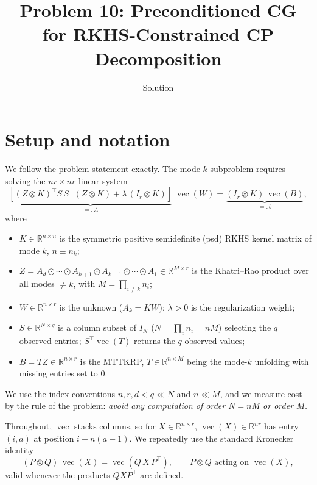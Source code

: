 \documentclass[12pt]{article}
\title{Problem 10: Preconditioned CG for RKHS-Constrained CP Decomposition}
\author{Solution}
\date{}
\DeclareMathOperator{\vecop}{vec}
\newcommand{\bR}{\mathbb{R}}
\theoremstyle{remark}
\begin{document}
\maketitle

\section{Setup and notation}

We follow the problem statement exactly. The mode-$k$ subproblem requires solving the
$nr \times nr$ linear system
\begin{equation}\label{eq:system}
  \underbrace{\left[
    (Z \otimes K)^{\!\top} S\, S^{\!\top} (Z \otimes K)
    + \lambda\, (I_r \otimes K)
  \right]}_{=:A}\; \vecop(W)
  = \underbrace{(I_r \otimes K)\,\vecop(B)}_{=:b},
\end{equation}
where
\begin{itemize}[nosep]
  \item $K \in \bR^{n\times n}$ is the symmetric positive semidefinite (psd) RKHS kernel matrix of mode $k$, $n \equiv n_k$;
  \item $Z = A_d \odot \cdots \odot A_{k+1} \odot A_{k-1} \odot \cdots \odot A_1 \in \bR^{M\times r}$ is the Khatri--Rao product over all modes $\neq k$, with $M = \prod_{i\neq k} n_i$;
  \item $W \in \bR^{n\times r}$ is the unknown ($A_k = KW$); $\lambda > 0$ is the regularization weight;
  \item $S \in \bR^{N\times q}$ is a column subset of $I_N$ ($N=\prod_i n_i = nM$) selecting the $q$ observed entries; $S^{\!\top}\vecop(T)$ returns the $q$ observed values;
  \item $B = TZ \in \bR^{n\times r}$ is the MTTKRP, $T\in\bR^{n\times M}$ being the mode-$k$ unfolding with missing entries set to $0$.
\end{itemize}
We use the index conventions $n,r,d < q \ll N$ and $n \ll M$, and we measure cost by the rule of the problem: \emph{avoid any computation of order $N=nM$ or order $M$.}

Throughout, $\vecop$ stacks columns, so for $X\in\bR^{n\times r}$, $\vecop(X)\in\bR^{nr}$ has entry $(i,a)$ at position $i + n(a-1)$. We repeatedly use the standard Kronecker identity
\begin{equation}\label{eq:kronvec}
  (P \otimes Q)\,\vecop(X) = \vecop\!\left(Q\,X\,P^{\!\top}\right),
  \qquad P\otimes Q \text{ acting on } \vecop(X),
\end{equation}
valid whenever the products $QXP^{\!\top}$ are defined.
\end{document}
